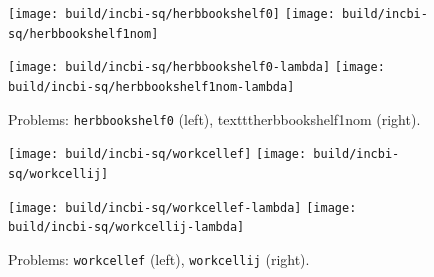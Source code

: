 \begin{figure}
   \centering
   \texttt{[image: build/incbi-sq/herbbookshelf0]}
   \texttt{[image: build/incbi-sq/herbbookshelf1nom]}
   
   \texttt{[image: build/incbi-sq/herbbookshelf0-lambda]}
   \texttt{[image: build/incbi-sq/herbbookshelf1nom-lambda]}
   \caption{Problems: \texttt{herbbookshelf0} (left), texttt{herbbookshelf1nom} (right).}
\end{figure}

\begin{figure}
   \centering
   \texttt{[image: build/incbi-sq/workcellef]}
   \texttt{[image: build/incbi-sq/workcellij]}
   
   \texttt{[image: build/incbi-sq/workcellef-lambda]}
   \texttt{[image: build/incbi-sq/workcellij-lambda]}
   \caption{Problems: \texttt{workcellef} (left), \texttt{workcellij} (right).}
\end{figure}
